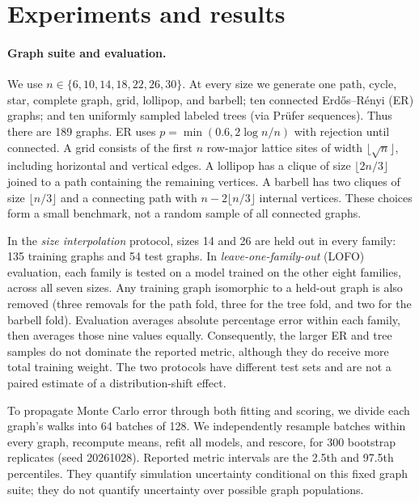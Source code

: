\documentclass{article}
\begin{document}
\section{Experiments and results}
\paragraph{Graph suite and evaluation.}
We use $n\in\{6,10,14,18,22,26,30\}$. At every size we generate one path, cycle, star, complete graph, grid, lollipop, and barbell; ten connected Erd\H{o}s--R\'enyi (ER) graphs; and ten uniformly sampled labeled trees (via Pr\"ufer sequences). Thus there are 189 graphs. ER uses $p=\min(0.6,2\log n/n)$ with rejection until connected. A grid consists of the first $n$ row-major lattice sites of width $\lfloor\sqrt n\rfloor$, including horizontal and vertical edges. A lollipop has a clique of size $\lfloor2n/3\rfloor$ joined to a path containing the remaining vertices. A barbell has two cliques of size $\lfloor n/3\rfloor$ and a connecting path with $n-2\lfloor n/3\rfloor$ internal vertices. These choices form a small benchmark, not a random sample of all connected graphs.

In the \emph{size interpolation} protocol, sizes 14 and 26 are held out in every family: 135 training graphs and 54 test graphs. In \emph{leave-one-family-out} (LOFO) evaluation, each family is tested on a model trained on the other eight families, across all seven sizes. Any training graph isomorphic to a held-out graph is also removed (three removals for the path fold, three for the tree fold, and two for the barbell fold). Evaluation averages absolute percentage error within each family, then averages those nine values equally. Consequently, the larger ER and tree samples do not dominate the reported metric, although they do receive more total training weight. The two protocols have different test sets and are not a paired estimate of a distribution-shift effect.

To propagate Monte Carlo error through both fitting and scoring, we divide each graph's walks into 64 batches of 128. We independently resample batches within every graph, recompute means, refit all models, and rescore, for 300 bootstrap replicates (seed 20261028). Reported metric intervals are the 2.5th and 97.5th percentiles. They quantify simulation uncertainty conditional on this fixed graph suite; they do not quantify uncertainty over possible graph populations.

\begin{table}[t]
\centering
\caption{Family-averaged absolute percentage error (\%). Brackets give Monte Carlo 95\% intervals, including refitting. The bound is scored as an estimate only.}
\label{tab:main}

\end{table}
\end{document}
